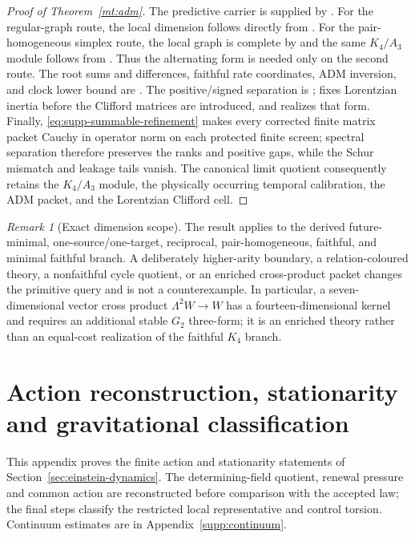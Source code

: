 \documentclass[11pt]{article}
\numberwithin{equation}{section}
\theoremstyle{definition}
\theoremstyle{remark}
\newtheorem{remark}[remark]{Remark}
\begin{document}
\begin{proof}[Proof of Theorem~\ref{mt:adm}]
The predictive carrier is supplied by .
For the regular-graph route, the local dimension follows directly from
.  For the pair-homogeneous simplex route, the
local graph is complete by  and the same
$K_4/A_3$ module follows from .
Thus the alternating form is needed only on the second route.  The root sums and
differences, faithful rate coordinates, ADM inversion, and clock lower bound
are .
The positive/signed separation is ;
 fixes Lorentzian inertia before the
Clifford matrices are introduced, and
 realizes that form.
Finally,
\eqref{eq:supp-summable-refinement} makes every corrected finite matrix packet
Cauchy in operator norm on each protected finite screen; spectral separation
therefore preserves the ranks and positive gaps, while the Schur mismatch and
leakage tails vanish.  The canonical limit quotient consequently retains the
$K_4/A_3$ module, the physically occurring temporal calibration, the ADM packet,
and the Lorentzian Clifford cell.
\end{proof}

\begin{remark}[Exact dimension scope]
The result applies to the derived future-minimal, one-source/one-target, reciprocal,
pair-homogeneous, faithful, and minimal faithful branch.  A deliberately
higher-arity boundary, a relation-coloured theory, a nonfaithful cycle quotient,
or an enriched cross-product packet changes the primitive query and is not a
counterexample.  In particular, a seven-dimensional vector cross product
$\Lambda^2W\to W$ has a fourteen-dimensional kernel and requires an additional
stable $G_2$ three-form; it is an enriched theory rather than an equal-cost
realization of the faithful $K_4$ branch.
\end{remark}


\section{Action reconstruction, stationarity and gravitational classification}
\label{supp:dynamics}

This appendix proves the finite action and stationarity statements of
Section~\ref{sec:einstein-dynamics}. The determining-field quotient,
renewal pressure and common action are reconstructed before comparison
with the accepted law; the final steps classify the restricted local
representative and control torsion. Continuum estimates are in
Appendix~\ref{supp:continuum}.
\end{document}

